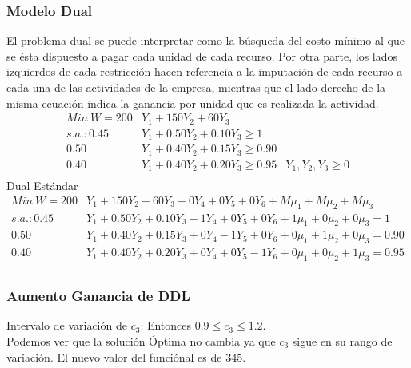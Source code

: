 \begin{homeworkProblem}[-1][Heladería]
\subsubsection{Modelo Dual}
El problema dual se puede interpretar como la búsqueda del costo mínimo al que se ésta dispuesto a pagar cada unidad de cada recurso. Por otra parte, los lados izquierdos de cada restricción hacen referencia a la imputación de cada recurso a cada una de las actividades de la empresa, mientras que el lado derecho de la misma ecuación indica la ganancia por unidad que es realizada la actividad.
\begin{align*}
    Min\ W = 200&Y_1 +150Y_2 + 60Y_3 \\
    s.a.: 0.45&Y_1 + 0.50Y_2 +0.10Y_3 \ge 1\\
          0.50&Y_1 + 0.40Y_2 +0.15Y_3 \ge 0.90\\
          0.40&Y_1 + 0.40Y_2 +0.20Y_3 \ge 0.95
          &Y_1,Y_2,Y_3 \ge 0\\
\end{align*}
Dual Estándar 
\begin{align*}
    Min\ W = 200&Y_1 +150Y_2 + 60Y_3 + 0Y_4 + 0Y_5 + 0Y_6 + M\mu_1 + M\mu_2 + M\mu_3 \\
    s.a.: 0.45&Y_1 + 0.50Y_2 +0.10Y_3 - 1Y_4 + 0Y_5 + 0Y_6 + 1\mu_1 + 0\mu_2 + 0\mu_3 = 1\\
          0.50&Y_1 + 0.40Y_2 +0.15Y_3 + 0Y_4 - 1Y_5 + 0Y_6 + 0\mu_1 + 1\mu_2 + 0\mu_3 = 0.90\\
          0.40&Y_1 + 0.40Y_2 +0.20Y_3 + 0Y_4 + 0Y_5 - 1Y_6 + 0\mu_1 + 0\mu_2 + 1\mu_3 = 0.95\\
\end{align*}

\subsubsection{Aumento Ganancia de DDL}
Intervalo de variación de $c_3$:
Entonces   $0.9 \le c_3 \le 1.2$. \\
Podemos ver que la solución Óptima no cambia ya que $c_3$ sigue en su rango de variación.
El nuevo valor del funciónal es de $345$.


\end{homeworkProblem}
